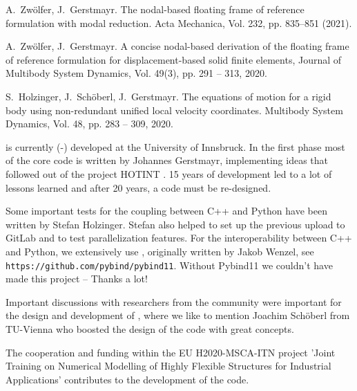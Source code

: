   \item A.\ Zw{\"o}lfer, J.\ Gerstmayr. The nodal-based floating frame of reference formulation with modal reduction. Acta Mechanica, Vol. 232, pp.  835--851 (2021). 
  \item A.\ Zw{\"o}lfer, J.\ Gerstmayr. A concise nodal-based derivation of the floating frame of reference formulation for displacement-based solid finite elements, Journal of Multibody System Dynamics, Vol. 49(3), pp. 291 -- 313, 2020. 
  \item S.\ Holzinger, J.\ Sch{\"o}berl, J.\ Gerstmayr. The equations of motion for a rigid body using non-redundant unified local velocity coordinates. Multibody System Dynamics, Vol. 48, pp. 283 -- 309, 2020. 
\ei

\codeName is currently (\the\month-\the\year) developed at the University of Innsbruck.
In the first phase most of the core code is written by Johannes Gerstmayr, implementing ideas that followed out of the project HOTINT \cite{GerstmayrEtAl2013}. 15 years of development led to a lot of lessons learned and after 20 years, a code must be re-designed.

Some important tests for the coupling between C++ and Python have been written by Stefan Holzinger. Stefan also helped to set up the previous upload to GitLab and to test parallelization features.
For the interoperability between C++ and Python, we extensively use \cite{pybind11}, originally written by Jakob Wenzel, see \texttt{https://github.com/pybind/pybind11}. Without Pybind11 we couldn't have made this project -- Thanks a lot!

Important discussions with researchers from the community were important for the design and development of \codeName , where we like to mention Joachim Sch{\"o}berl from TU-Vienna who boosted the design of the code with great concepts. 

The cooperation and funding within the EU H2020-MSCA-ITN project 'Joint Training on Numerical Modelling of Highly Flexible Structures for Industrial Applications' contributes to the development of the code.


